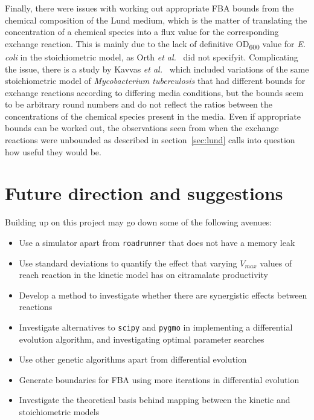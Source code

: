 \documentclass[parskip=full]{scrreprt}
\begin{document}
Finally, there were issues with working out appropriate FBA bounds from the chemical composition of the Lund medium, which is the matter of translating the concentration of a chemical species into a flux value for the corresponding exchange reaction. This is mainly due to the lack of definitive OD\textsubscript{600} value for \emph{E. coli} in the stoichiometric model, as Orth \emph{et al.}~\cite{orth_comprehensive_2011} did not specifyit. Complicating the issue, there is a study by Kavvas \emph{et al.}~\cite{kavvas_updated_2018} which included variations of the same stoichiometric model of \emph{Mycobacterium tuberculosis} that had different bounds for exchange reactions according to differing media conditions, but the bounds seem to be arbitrary round numbers and do not reflect the ratios between the concentrations of the chemical species present in the media. Even if appropriate bounds can be worked out, the observations seen from when the exchange reactions were unbounded as described in section~\ref{sec:lund} calls into question how useful they would be.

\section{Future direction and suggestions}
\label{sec:future}

Building up on this project may go down some of the following avenues:

\begin{itemize}
\item Use a simulator apart from \texttt{roadrunner} that does not have a memory leak
\item Use standard deviations to quantify the effect that varying $V_{max}$ values of reach reaction in the kinetic model has on citramalate productivity
\item Develop a method to investigate whether there are synergistic effects between reactions
\item Investigate alternatives to \texttt{scipy} and \texttt{pygmo} in implementing a differential evolution algorithm, and investigating optimal parameter searches
\item Use other genetic algorithms apart from differential evolution
\item Generate boundaries for FBA using more iterations in differential evolution
\item Investigate the theoretical basis behind mapping between the kinetic and stoichiometric models
\end{itemize}
  
\end{document}
